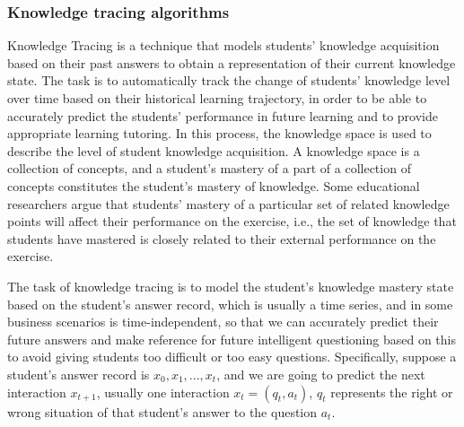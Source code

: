 \documentclass[11pt,en]{elegantpaper}
\begin{document}
\subsubsection{Knowledge tracing algorithms}
Knowledge Tracing is a technique that models students' knowledge acquisition based on their past answers to obtain a representation of their current knowledge state. The task is to automatically track the change of students' knowledge level over time based on their historical learning trajectory, in order to be able to accurately predict the students' performance in future learning and to provide appropriate learning tutoring. In this process, the knowledge space is used to describe the level of student knowledge acquisition. A knowledge space is a collection of concepts, and a student's mastery of a part of a collection of concepts constitutes the student's mastery of knowledge. Some educational researchers argue that students' mastery of a particular set of related knowledge points will affect their performance on the exercise, i.e., the set of knowledge that students have mastered is closely related to their external performance on the exercise.

The task of knowledge tracing is to model the student's knowledge mastery state based on the student's answer record, which is usually a time series, and in some business scenarios is time-independent, so that we can accurately predict their future answers and make reference for future intelligent questioning based on this to avoid giving students too difficult or too easy questions. Specifically, suppose a student's answer record is $x_0,x_1,...,x_t$, and we are going to predict the next interaction $x_{t+1}$, usually one interaction $x_t=(q_t,a_t)$, $q_t$ represents the right or wrong situation of that student's answer to the question $a_t$.
\end{document}
